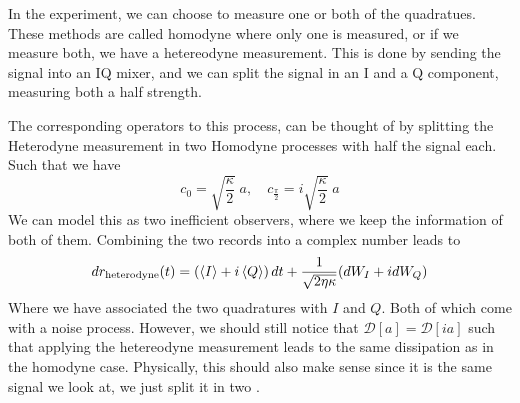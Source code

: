 In the experiment, we can choose to measure one or both of the quadratues. These methods are called homodyne where only one is measured, or if we measure both,  we have a hetereodyne measurement. This is done by sending the signal into an IQ mixer, and we can split the signal in an I and a Q component, measuring both a half strength. 

The corresponding operators to this process, can be thought of by splitting the Heterodyne measurement in two Homodyne processes with half the signal each. Such that we have
\begin{equation}
    c_0 = \sqrt{\frac{\kappa}{2}}\; a, \quad c_{\frac{\pi}{2}} = i \sqrt{\frac{\kappa}{2}} \; a
\end{equation}
We can model this as two inefficient observers, where we keep the information of both of them. Combining the two records into a complex number leads to
\begin{equation}
    dr_{\text{heterodyne}}(t) = \left(\expval{I} + i\expval{Q}\right)dt  + \frac{1}{\sqrt{2\eta\kappa}}(dW_I + i dW_Q)
\end{equation}
Where we have associated the two quadratures with $I$ and $Q$. Both of which come with a noise process. However, we should still notice that $\mathcal{D}[a] = \mathcal{D}[ia]$ such that applying the hetereodyne measurement leads to the same dissipation as in the homodyne case. Physically, this should also make sense since it is the same signal we look at, we just split it in two \cite{campagne-ibarcq_measurement_nodate}. 



